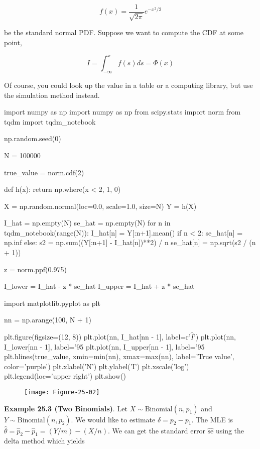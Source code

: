 \[ f(x) = \frac{1}{\sqrt{2 \pi}} e^{-x^{2} / 2} \]

be the standard normal PDF. Suppose we want to compute the CDF at some
point,

\[ I = \int_{-\infty}^x f(s) ds = \Phi(x) \]

Of course, you could look up the value in a table or a computing
library, but  use the simulation method instead.

\begin{python}
import numpy as np
import numpy as np
from scipy.stats import norm
from tqdm import tqdm_{n}otebook

np.random.seed(0)

N = 100000

true_value = norm.cdf(2)

def h(x):
    return np.where(x < 2, 1, 0)

X = np.random.normal(loc=0.0, scale=1.0, size=N)
Y = h(X)

I_hat = np.empty(N)
se_hat = np.empty(N)
for n in tqdm_{n}otebook(range(N)):
    I_hat[n] = Y[:n+1].mean()
    if n < 2:
        se_hat[n] = np.inf
    else:
        s2 = np.sum((Y[:n+1] - I_hat[n])**2) / n
        se_hat[n] = np.sqrt(s2 / (n + 1))
        
z = norm.ppf(0.975)

I_lower = I_hat - z * se_hat
I_upper = I_hat + z * se_hat
\end{python}

\begin{python}
import matplotlib.pyplot as plt

nn = np.arange(100, N + 1)

plt.figure(figsize=(12, 8))
plt.plot(nn, I_hat[nn - 1], label=r'$\hat{I}$')
plt.plot(nn, I_lower[nn - 1], label='95%
plt.plot(nn, I_upper[nn - 1], label='95%
plt.hlines(true_value, xmin=min(nn), xmax=max(nn), label='True value', color='purple')
plt.xlabel('N')
plt.ylabel('I')
plt.xscale('log')
plt.legend(loc='upper right')
plt.show()
\end{python}

\begin{figure}[H]
\centering
\texttt{[image: Figure-25-02]}
\end{figure}

\textbf{Example 25.3 (Two Binomials)}. Let
\(X \sim \text{Binomial}(n, p_{1})\) and
\(Y \sim \text{Binomial}(n, p_{2})\). We would like to estimate
\(\delta = p_{2} - p_{1}\). The MLE is
\(\hat{\theta} = \hat{p}_{2} - \hat{p}_{1} = (Y / m) - (X / n)\). We can get
the standard error \(\hat{\text{se}}\) using the delta method which
yields

